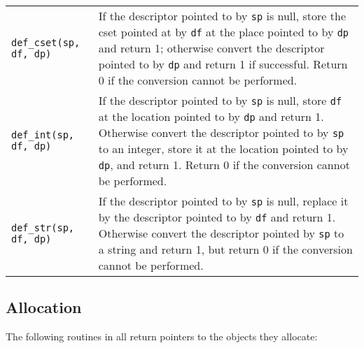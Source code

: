 \begin{xtabular}{l@{\hspace{1cm}}p{11cm}}

\texttt{def\_cset(sp, df, dp)} &
If the descriptor pointed to by \texttt{sp} is null, store the cset pointed at
by \texttt{df} at the place pointed to by \texttt{dp} and return 1; otherwise
convert the descriptor pointed to by \texttt{dp} and return 1 if successful.
Return 0 if the conversion cannot be performed.\\

\texttt{def\_int(sp, df, dp)} &
If the descriptor pointed to by \texttt{sp} is null, store \texttt{df} at the
location pointed to by \texttt{dp} and return 1. Otherwise convert the
descriptor pointed to by \texttt{sp} to an integer, store it at the
location pointed to by \texttt{dp}, and return 1. Return 0 if the
conversion cannot be performed.\\

\texttt{def\_str(sp, df, dp)} &
If the descriptor pointed to by \texttt{sp} is null, replace it by the
descriptor pointed to by \texttt{df} and return 1. Otherwise convert the
descriptor pointed by \texttt{sp} to a string and return 1, but return
0 if the conversion cannot be performed.\\

\end{xtabular}


\subsection{Allocation}

The following routines in  all return pointers to the
objects they allocate:


